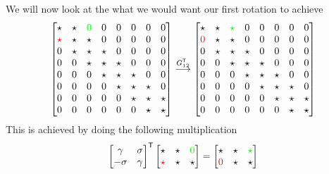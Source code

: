 \documentclass{article}
\begin{document}
\pagebreak

\noindent We will now look at the what we would want our first rotation to achieve
\begin{equation*}
    \begin{bmatrix}
    \star & \star &\color{green} 0 \color{black} & 0 & 0 & 0 & 0 & 0 \\
        \color{red}\star\color{green} & \star & \star & 0& 0 & 0 & 0 & 0 \\
        0 & \star & \star & \star & 0 & 0 & 0 & 0 \\
        0 & 0 & \star & \star & \star & 0 & 0 & 0 \\
         0 & 0 & 0 & \star & \star & \star & 0  & 0 \\
         0 & 0 & 0 & 0 & \star & \star & \star & 0\\
         0 & 0 & 0 & 0 & 0 & \star& \star & \star \\
         0 & 0 & 0 & 0 & 0 & 0& \star & \star \\
    \end{bmatrix}
    \overset{G_{12}^{\mathsf{T}}}{\longrightarrow}
        \begin{bmatrix}
    \star & \star &\color{green} \star \color{black} & 0 & 0 & 0 & 0 & 0 \\
        \color{red}0\color{green} & \star & \star & 0& 0 & 0 & 0 & 0 \\
        0 & \star & \star & \star & 0 & 0 & 0 & 0 \\
        0 & 0 & \star & \star & \star & 0 & 0 & 0 \\
         0 & 0 & 0 & \star & \star & \star & 0  & 0 \\
         0 & 0 & 0 & 0 & \star & \star & \star & 0\\
         0 & 0 & 0 & 0 & 0 & \star& \star & \star \\
         0 & 0 & 0 & 0 & 0 & 0& \star & \star \\
    \end{bmatrix}
\end{equation*}
This is achieved by doing the following multiplication
\begin{equation*}
    \begin{bmatrix}
        \gamma & \sigma \\
        -\sigma & \gamma 
    \end{bmatrix}^{\mathsf{T}}
    \begin{bmatrix}
        \star & \star &\color{green} 0 \\
        \color{red} \star \color{black} & \star & \star
    \end{bmatrix}
    =
    \begin{bmatrix}
        \star & \star &\color{green} \star \color{black} \\
         \color{red}0\color{green} & \star & \star
    \end{bmatrix}
\end{equation*}
\end{document}

